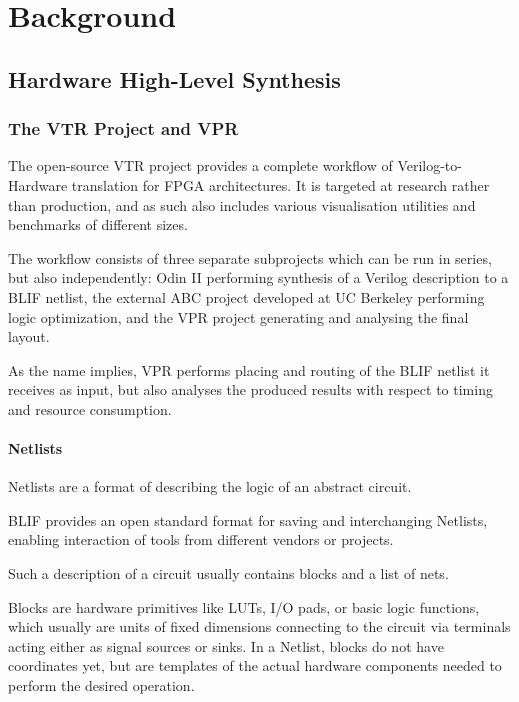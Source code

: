 
\chapter{Background}\label{ch:relatedwork}
\glsresetall %

\section{Hardware High-Level Synthesis}

\subsection{The VTR Project and VPR}

The open-source \gls{VTR} project\cite{vtr8} provides a complete workflow of Verilog-to-Hardware translation for \gls{FPGA} architectures. It is targeted at research rather than production, and as such also includes various visualisation utilities and benchmarks of different sizes.

The workflow consists of three separate subprojects which can be run in series, but also independently: Odin II performing synthesis of a Verilog description to a \gls{BLIF} netlist, the external ABC project developed at UC Berkeley\cite{ABC-web} performing logic optimization, and the \gls{VPR} project generating and analysing the final layout.

As the name implies, \gls{VPR} performs placing and routing of the \gls{BLIF} netlist it receives as input, but also analyses the produced results with respect to timing and resource consumption.

\subsubsection{Netlists}

Netlists are a format of describing the logic of an abstract circuit. 

\gls{BLIF} provides an open standard format for saving and interchanging Netlists, enabling interaction of tools from different vendors or projects. 

Such a description of a circuit usually contains blocks and a list of nets.

Blocks are hardware primitives like \glspl{LUT}, \gls{I/O} pads, or basic logic functions, which usually are units of fixed dimensions connecting to the circuit via terminals acting either as signal sources or sinks. In a Netlist, blocks do not have coordinates yet, but are templates of the actual hardware components needed to perform the desired operation.

